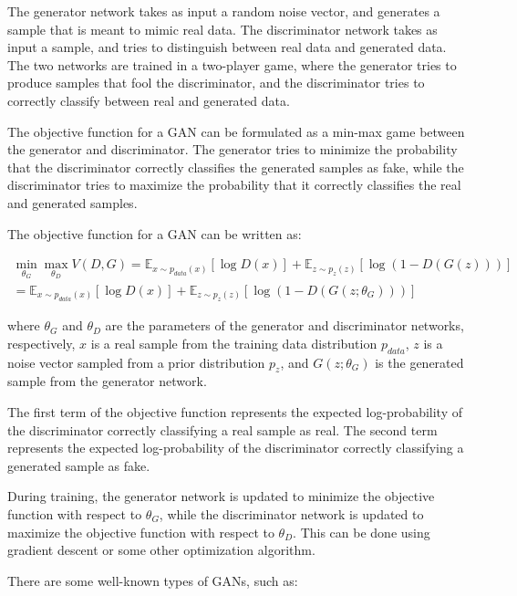 The generator network takes as input a random noise vector, and generates a sample that is meant to mimic real data. The discriminator network takes as input a sample, and tries to distinguish between real data and generated data. The two networks are trained in a two-player game, where the generator tries to produce samples that fool the discriminator, and the discriminator tries to correctly classify between real and generated data.

The objective function for a \ac{GAN} can be formulated as a min-max game between the generator and discriminator. The generator tries to minimize the probability that the discriminator correctly classifies the generated samples as fake, while the discriminator tries to maximize the probability that it correctly classifies the real and generated samples.

The objective function for a \ac{GAN} can be written as:

\begin{equation}
\begin{split}
	\min_{\theta_G}\max_{\theta_D} V(D, G) = \mathbb{E}_{x\sim p_{data}(x)}[\log D(x)] + \mathbb{E}_{z\sim p_z(z)}[\log(1-D(G(z)))] \\
	= \mathbb{E}_{x\sim p_{data}(x)}[\log D(x)] + \mathbb{E}_{z\sim p_z(z)}[\log(1-D(G(z;\theta_G)))]
\end{split}
\end{equation}

where $\theta_G$ and $\theta_D$ are the parameters of the generator and discriminator networks, respectively, $x$ is a real sample from the training data distribution $p_{data}$, $z$ is a noise vector sampled from a prior distribution $p_z$, and $G(z;\theta_G)$ is the generated sample from the generator network.

The first term of the objective function represents the expected log-probability of the discriminator correctly classifying a real sample as real. The second term represents the expected log-probability of the discriminator correctly classifying a generated sample as fake.

During training, the generator network is updated to minimize the objective function with respect to $\theta_G$, while the discriminator network is updated to maximize the objective function with respect to $\theta_D$. This can be done using gradient descent or some other optimization algorithm.

There are some well-known types of \acp{GAN}, such as:

